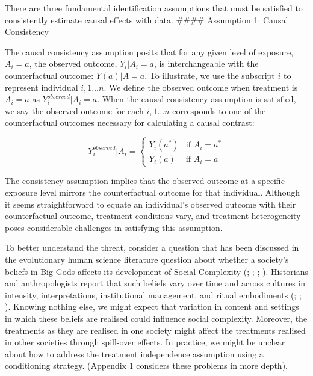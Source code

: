 \documentclass[
  singlecolumn,
  9pt]{article}
\begin{document}
There are three fundamental identification assumptions that must be
satisfied to consistently estimate causal effects with data. \#\#\#\#
Assumption 1: Causal Consistency

The causal consistency assumption posits that for any given level of
exposure, \(A_i=a\), the observed outcome, \(Y_i|A_i=a\), is
interchangeable with the counterfactual outcome: \(Y(a)|A = a\). To
illustrate, we use the subscript \(i\) to represent individual
\(i, 1 \dots n\). We define the observed outcome when treatment is
\(A_i = a\) as \(Y_i^{observed}|A_i = a\). When the causal consistency
assumption is satisfied, we say the observed outcome for each
\(i, 1 \dots n\) corresponds to one of the counterfactual outcomes
necessary for calculating a causal contrast:

\[
Y_i^{observed}|A_i = 
\begin{cases} 
Y_i(a^*) & \text{if } A_i = a^* \\
Y_i(a) & \text{if } A_i = a
\end{cases}
\]

The consistency assumption implies that the observed outcome at a
specific exposure level mirrors the counterfactual outcome for that
individual. Although it seems straightforward to equate an individual's
observed outcome with their counterfactual outcome, treatment conditions
vary, and treatment heterogeneity poses considerable challenges in
satisfying this assumption.

To better understand the threat, consider a question that has been
discussed in the evolutionary human science literature question about
whether a society's beliefs in Big Gods affects its development of
Social Complexity (;
;
;
).
Historians and anthropologists report that such beliefs vary over time
and across cultures in intensity, interpretations, institutional
management, and ritual embodiments (; ;
). Knowing nothing else, we
might expect that variation in content and settings in which these
beliefs are realised could influence social complexity. Moreover, the
treatments as they are realised in one society might affect the
treatments realised in other societies through spill-over effects. In
practice, we might be unclear about how to address the treatment
independence assumption using a conditioning strategy. (Appendix 1
considers these problems in more depth).
\end{document}
